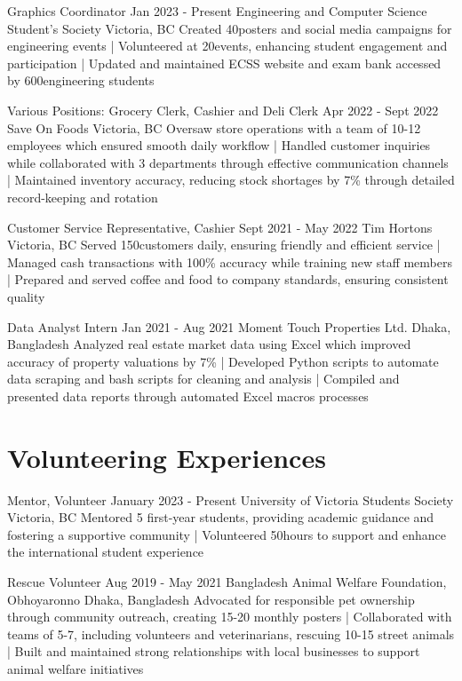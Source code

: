 \documentclass[a4paper,10pt]{article}
\begin{document}
\relevantexperience
{Graphics Coordinator}
{Jan 2023 - Present}
{Engineering and Computer Science Student’s Society}
{Victoria, BC}
{Created 40\plus posters and social media campaigns for engineering events 
| Volunteered at 20\plus events, enhancing student engagement and participation 
| Updated and maintained ECSS website and exam bank accessed by 600\plus engineering students
}

\relevantexperience
{Various Positions: Grocery Clerk, Cashier and Deli Clerk}
{Apr 2022 - Sept 2022}
{Save On Foods}
{Victoria, BC}
{Oversaw store operations with a team of 10-12 employees which ensured smooth daily workflow 
| Handled customer inquiries while collaborated with 3 departments through effective communication channels 
| Maintained inventory accuracy, reducing stock shortages by 7\% through detailed record-keeping and rotation
}

\relevantexperience
{Customer Service Representative, Cashier}
{Sept 2021 - May 2022}
{Tim Hortons}
{Victoria, BC}
{Served 150\plus customers daily, ensuring friendly and efficient service 
| Managed cash transactions with 100\% accuracy while training new staff members 
| Prepared and served coffee and food to company standards, ensuring consistent quality
}

\relevantexperience
{Data Analyst Intern}
{Jan 2021 - Aug 2021}
{Moment Touch Properties Ltd.}
{Dhaka, Bangladesh}
{Analyzed real estate market data using Excel which improved accuracy of property valuations by 7\% 
| Developed Python scripts to automate data scraping and bash scripts for cleaning and analysis
| Compiled and presented data reports through automated Excel macros processes
}

\section{Volunteering Experiences}

\relevantexperience
{Mentor, Volunteer}
{January 2023 - Present}
{University of Victoria Students Society}
{Victoria, BC}
{Mentored 5 first-year students, providing academic guidance and fostering a supportive community
| Volunteered 50\plus hours to support and enhance the international student experience 
}

\relevantexperience
{Rescue Volunteer}
{Aug 2019 - May 2021}
{Bangladesh Animal Welfare Foundation, Obhoyaronno}
{Dhaka, Bangladesh}
{Advocated for responsible pet ownership through community outreach, creating 15-20 monthly posters 
| Collaborated with teams of 5-7, including volunteers and veterinarians, rescuing 10-15 street animals 
| Built and maintained strong relationships with local businesses to support animal welfare initiatives
}
\end{document}
